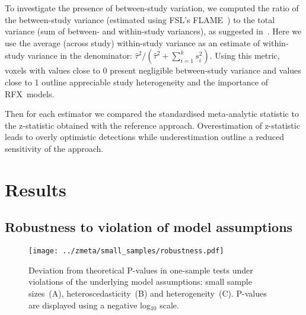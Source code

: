 \documentclass[preprint]{elsarticle}
\newcommand{\vareffect}[1][i]{s^2_{#1}}
\newcommand{\nStudies}{k}
\newcommand{\varBetween}{\tau^2}
\newcommand{\estvarBetween}{\hat\tau^2}
\newcommand{\sampleSize}[1][i]{n_{#1}}
\begin{document}
To investigate the presence of between-study variation, we computed the ratio of the between-study variance (estimated using FSL's FLAME~\cite{Smith2001}) to the total variance (sum of between- and within-study variances), as suggested in~\cite{Chen2012}. Here we use the average (across study) within-study variance as an estimate of within-study variance in the denominator:
$\estvarBetween / (\estvarBetween + \sum_{i=1}^{\nStudies} \vareffect)$.
Using this metric, voxels with values close to 0 present negligible between-study variance and values close to 1 outline appreciable study heterogeneity and the importance of RFX~models.

Then for each estimator we compared the standardised meta-analytic statistic to the z-statistic obtained with the reference approach. Overestimation of z-statistic leads to overly optimistic detections while underestimation outline a reduced sensitivity of the approach. 


\section{Results}\label{sec_res}

\subsection{Robustness to violation of model assumptions}

\begin{figure}[h]
	\centering
 	\texttt{[image: ../zmeta/small\_samples/robustness.pdf]}
	\caption{Deviation from theoretical P-values in one-sample tests under violations of the underlying model assumptions: small sample sizes~(A), heteroscedasticity~(B) and heterogeneity~(C). P-values are displayed using a negative log$_{10}$ scale.}
	\label{fig:robustness}
\end{figure}


\end{document}
